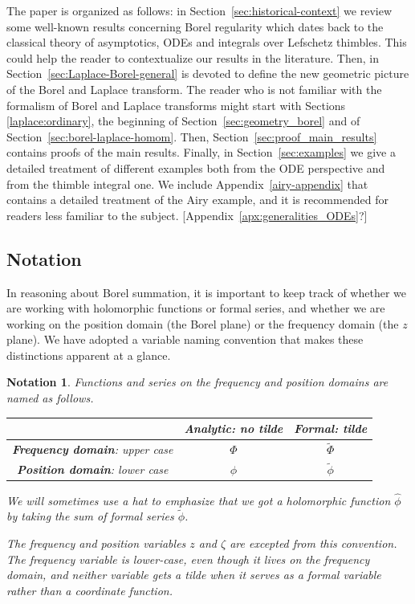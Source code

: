 \documentclass{article}
\newcommand{\series}[1]{\tilde{#1}}
\theoremstyle{definition}
\theoremstyle{plain}
\newtheorem*{notation*}{Notation}
\newenvironment{todo}{\color{Coral}}{\color{black}}
\newenvironment{draft}{\color{SlateBlue}}{\color{black}}
\begin{document}
\begin{todo}\par [Consider going back to non-separated style.]\end{todo}\begin{draft}The paper is organized as follows: in Section~\ref{sec:historical-context} we review some well-known results concerning Borel regularity which dates back to the classical theory of asymptotics, ODEs and integrals over Lefschetz thimbles. This could help the reader to contextualize our results in the literature. Then, in Section~\ref{sec:Laplace-Borel-general} is devoted to define the new geometric picture of the Borel and Laplace transform. The reader who is not familiar with the formalism of Borel and Laplace transforms might start with Sections \ref{laplace:ordinary}, the beginning of Section~\ref{sec:geometry_borel} and of Section~\ref{sec:borel-laplace-homom}. Then, Section~\ref{sec:proof_main_results} contains proofs of the main results. Finally, in Section~\ref{sec:examples} we give a detailed treatment of different examples both from the ODE perspective and from the thimble integral one. 
We include Appendix~\ref{airy-appendix} that contains a detailed treatment of the Airy example, and it is recommended for readers less familiar to the subject. \begin{todo}[Appendix~\ref{apx:generalities_ODEs}?]\end{todo}
\end{draft}
%
\subsection{Notation}
In reasoning about Borel summation, it is important to keep track of whether we are working with holomorphic functions or formal series, and whether we are working on the position domain (the Borel plane) or the frequency domain (the $z$ plane). We have adopted a variable naming convention that makes these distinctions apparent at a glance.
\begin{notation*}
Functions and series on the frequency and position domains are named as follows.
\begin{center}
\begin{tabular}{c|c|c}
& \textbf{Analytic}: no tilde & \textbf{Formal}: tilde \\[1mm] \hline
\vphantom{\rule{0mm}{5mm}} \textbf{Frequency domain}: upper case & $\Phi$ & $\series{\Phi}$ \\[1mm] \hline
\vphantom{\rule{0mm}{5mm}} \textbf{Position domain}: lower case & $\phi$ & $\series{\phi}$ \\[1mm]
\end{tabular}
\end{center}
We will sometimes use a hat to emphasize that we got a holomorphic function $\hat{\phi}$ by taking the sum of formal series $\series{\phi}$.

The frequency and position variables $z$ and $\zeta$ are excepted from this convention. The frequency variable is lower-case, even though it lives on the frequency domain, and neither variable gets a tilde when it serves as a formal variable rather than a coordinate function.
\end{notation*}
\end{document}
